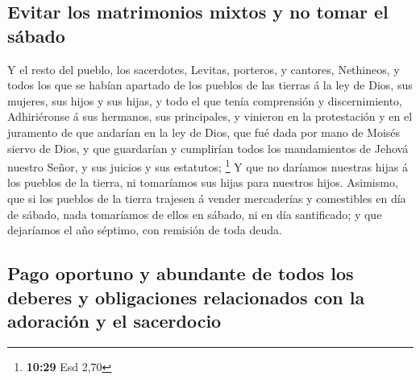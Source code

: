 \hypertarget{evitar-los-matrimonios-mixtos-y-no-tomar-el-suxe1bado}{%
\subsection{Evitar los matrimonios mixtos y no tomar el
sábado}\label{evitar-los-matrimonios-mixtos-y-no-tomar-el-suxe1bado}}

 Y el resto del pueblo, los sacerdotes, Levitas,
porteros, y cantores, Nethineos, y todos los que se habían apartado de
los pueblos de las tierras á la ley de Dios, sus mujeres, sus hijos y
sus hijas, y todo el que tenía comprensión y discernimiento,
 Adhiriéronse á sus hermanos, sus principales, y vinieron
en la protestación y en el juramento de que andarían en la ley de Dios,
que fué dada por mano de Moisés siervo de Dios, y que guardarían y
cumplirían todos los mandamientos de Jehová nuestro Señor, y sus juicios
y sus estatutos; \footnote{\textbf{10:29} Esd 2,70}  Y
que no daríamos nuestras hijas á los pueblos de la tierra, ni tomaríamos
sus hijas para nuestros hijos.  Asimismo, que si los
pueblos de la tierra trajesen á vender mercaderías y comestibles en día
de sábado, nada tomaríamos de ellos en sábado, ni en día santificado; y
que dejaríamos el año séptimo, con remisión de toda deuda.

\hypertarget{pago-oportuno-y-abundante-de-todos-los-deberes-y-obligaciones-relacionados-con-la-adoraciuxf3n-y-el-sacerdocio}{%
\subsection{Pago oportuno y abundante de todos los deberes y
obligaciones relacionados con la adoración y el
sacerdocio}\label{pago-oportuno-y-abundante-de-todos-los-deberes-y-obligaciones-relacionados-con-la-adoraciuxf3n-y-el-sacerdocio}}

